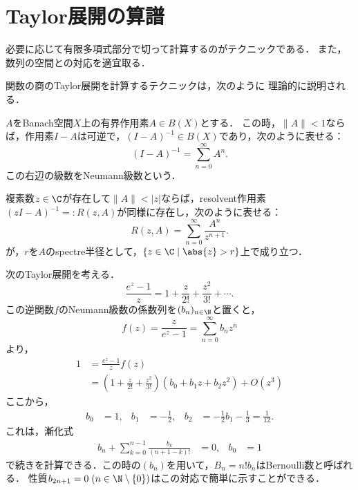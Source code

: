 \documentclass[uplatex, dvipdfmx]{jsreport}
\begin{document}
\section{Taylor展開の算譜}

\begin{screen}
    必要に応じて有限多項式部分で切って計算するのがテクニックである．
    また，数列の空間との対応を適宜取る．
\end{screen}

関数の商のTaylor展開を計算するテクニックは，次のように
理論的に説明される．

\begin{proposition}[Neumann級数展開]
    $A$をBanach空間$X$上の有界作用素$A\in B(X)$とする．
    この時，$\|A\|<1$ならば，作用素$I-A$は可逆で，$(I-A)^{-1}\in B(X)$であり，次のように表せる：
    \[(I-A)^{-1}=\sum^\infty_{n=0}A^n.\]
    この右辺の級数をNeumann級数という．
\end{proposition}
\begin{corollary}
    複素数$z\in\C$が存在して$\|A\|<|z|$ならば，resolvent作用素$(zI-A)^{-1}=:R(z,A)$が同様に存在し，次のように表せる：
    \[R(z,A)=\sum^\infty_{n=0}\frac{A^n}{z^{n+1}}.\]
    が，$r$を$A$のspectre半径として，$\{z\in\C\mid\abs{z}>r\}$上で成り立つ．
\end{corollary}

\begin{example}
    次のTaylor展開を考える．
    \[\frac{e^z-1}{z}=1+\frac{z}{2!}+\frac{z^2}{3!}+\cdots.\]
    この逆関数$f$のNeumann級数の係数列を$(b_n)_{n\in\N}$と置くと，
    \[f(z)=\frac{z}{e^z-1}=\sum^\infty_{n=0}b_nz^n\]
    より，
    \begin{align*}
        1&=\frac{e^z-1}{z}f(z)\\
        &=\left(1+\frac{z}{2!}+\frac{z^2}{3!}\right)(b_0+b_1z+b_2z^2)+O(z^3)
    \end{align*}
    ここから，
    \begin{align*}
        b_0&=1,&b_1&=-\frac{1}{2},&b_2&=-\frac{1}{2}b_1-\frac{1}{3}=\frac{1}{12}.
    \end{align*}
    これは，漸化式
    \begin{align*}
        b_n+\sum^{n-1}_{k=0}\frac{b_k}{(n+1-k)!}&=0,&b_0&=1
    \end{align*}
    で続きを計算できる．この時の$(b_n)$を用いて，$B_n=n!b_n$はBernoulli数と呼ばれる．
    性質$b_{2n+1}=0\;(n\in\N\setminus\{0\})$はこの対応で簡単に示すことができる．
\end{example}
\end{document}
